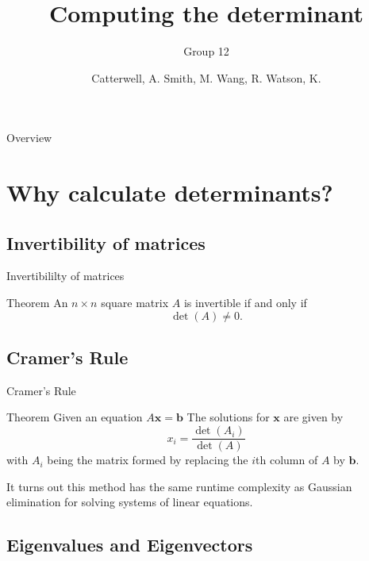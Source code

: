 \documentclass{beamer}
\title{Computing the determinant}
\subtitle{Group 12}
\author{Catterwell, A. \quad Smith, M. \quad Wang, R. \quad Watson, K.}
\institute{University of Edinburgh}
\begin{document}
\begin{frame}
    \maketitle
\end{frame}

\begin{frame}{Overview}
    \tableofcontents
 \end{frame}

\section{Why calculate determinants?}

\subsection{Invertibility of matrices}
\begin{frame}{Invertibililty of matrices}

    \begin{block}{Theorem}
        An $n \times n$ square matrix $A$ is invertible if and only if
        \[
            \det(A) \neq 0.
        \]
    \end{block}

\end{frame}

\subsection{Cramer's Rule}

\begin{frame}{Cramer's Rule}

    \begin{block}{Theorem}
        Given an equation $A\mathbf{x} = \mathbf{b}$
        The solutions for $\mathbf{x}$ are given by
        \[
            x_i = \frac{\det(A_i)}{\det(A)}
        \]
        with $A_i$ being the matrix formed by replacing the $i$th column
        of $A$ by $\mathbf{b}$.
    \end{block}


    It turns out this method has the same runtime complexity as Gaussian elimination for solving
    systems of linear equations.

\end{frame}

\subsection{Eigenvalues and Eigenvectors}
\end{document}
